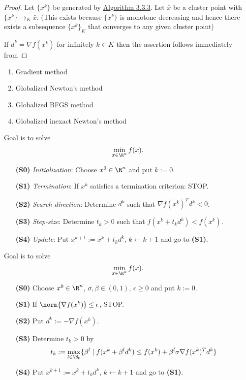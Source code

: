 \begin{proof}

	\def\xk{\{x^k\}}
	\def\grad{\nabla f(x^k)}

	Let $\xk$ be generated by \hyperref[a7a5665]{Algorithm 3.3.3}. Let
	$\bar x$ be a cluster point with $\xk\to_K\bar x$. (This exists
	because $\xk$ is monotone decreasing and hence there exists a
	subsequence $\xk_K$ that converges to any given cluster point)

	If $d^k=\grad$ for infinitely $k\in K$ then the assertion follows immediately from

\end{proof}

\label{a75d03d}

\begin{enumerate}
	\item Gradient method
	\item Globalized Newton's method
	\item Globalized BFGS method
	\item Globalized inexact Newton's method
\end{enumerate}

\label{edbf62c}

Goal is to solve
$$\min_{x\in\R^n}f(x).$$

\begin{enumerate}
	\item [\textbf{(S0)}] \textit{Initialization}: Choose $x^0\in\R^n$ and put $k:=0$.
	\item [\textbf{(S1)}] \textit{Termination}: If $x^k$ satisfies a termination criterion: STOP.
	\item [\textbf{(S2)}] \textit{Search direction}: Determine $d^k$ such that $\nabla f(x^k)^Td^k<0$.
	\item [\textbf{(S3)}] \textit{Step-size}: Determine $t_k>0$ such that $f(x^k+t_kd^k)<f(x^k)$.
	\item [\textbf{(S4)}] \textit{Update}: Put $x^{k+1}:=x^k+t_kd^k$, $k\gets k+1$ and go to \textbf{(S1)}.
\end{enumerate}

\label{ae01f6d}

Goal is to solve
$$\min_{x\in\R^n}f(x).$$

\begin{enumerate}
	\item [\textbf{(S0)}] Choose $x^0\in\R^n$, $\sigma,\beta\in(0,1)$, $\epsilon\geq0$ and put $k:=0$.
	\item [\textbf{(S1)}] If $\norm{\nabla f(x^k)}\leq\epsilon$, STOP.
	\item [\textbf{(S2)}] Put $d^k:=-\nabla f(x^k)$.
	\item [\textbf{(S3)}] Determine $t_k>0$ by
	      $$t_k:=\max_{l\in\N_0}\{\beta^l\mid f(x^k+\beta^ld^k)\leq f(x^k)+\beta^l\sigma\nabla f(x^k)^Td^k\}$$
	\item [\textbf{(S4)}] Put $x^{k+1}:=x^k+t_kd^k$, $k\gets k+1$ and go to \textbf{(S1)}.
\end{enumerate}

